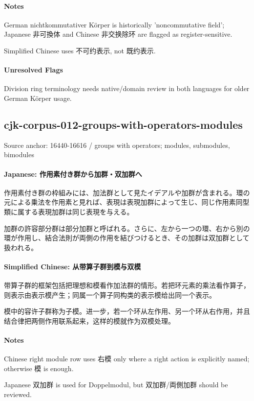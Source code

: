 \documentclass[11pt]{article}
\begin{document}
\paragraph{Notes}
German nichtkommutativer Körper is historically 'noncommutative field'; Japanese 非可換体 and Chinese 非交换除环 are flagged as register-sensitive.\par
Simplified Chinese uses 不可约表示, not 既约表示.\par
\paragraph{Unresolved Flags}
Division ring terminology needs native/domain review in both languages for older German Körper usage.\par
\subsection*{cjk-corpus-012-groups-with-operators-modules}
Source anchor: 16440-16616 / groups with operators; modules, submodules, bimodules
\par
\paragraph{Japanese: 作用素付き群から加群・双加群へ}
作用素付き群の枠組みには、加法群として見たイデアルや加群が含まれる。環の元による乗法を作用素と見れば、表現は表現加群によって生じ、同じ作用素同型類に属する表現加群は同じ表現を与える。\par
加群の許容部分群は部分加群と呼ばれる。さらに、左から一つの環、右から別の環が作用し、結合法則が両側の作用を結びつけるとき、その加群は双加群として扱われる。\par
\paragraph{Simplified Chinese: 从带算子群到模与双模}
带算子群的框架包括把理想和模看作加法群的情形。若把环元素的乘法看作算子，则表示由表示模产生；同属一个算子同构类的表示模给出同一个表示。\par
模中的容许子群称为子模。进一步，若一个环从左作用、另一个环从右作用，并且结合律把两侧作用联系起来，这样的模就作为双模处理。\par
\paragraph{Notes}
Chinese right module row uses 右模 only where a right action is explicitly named; otherwise 模 is enough.\par
Japanese 双加群 is used for Doppelmodul, but 双加群/両側加群 should be reviewed.\par
\end{document}
